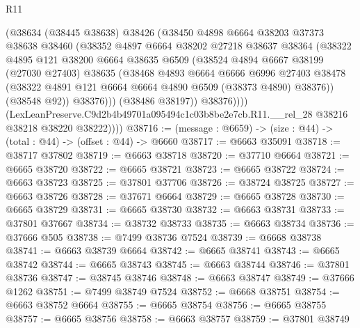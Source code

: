 \begin{lexlean}{R11}
\begin{coremodule}
                  (@38634
                    (@38445 @38638)
                    @38426
                    (@38450
                      @4898
                      @6664
                      @38203
                      @37373
                      @38638
                      @38460
                      (@38352
                        @4897
                        @6664
                        @38202
                        @27218
                        @38637
                        @38364
                        (@38322
                          @4895
                          @121
                          @38200
                          @6664
                          @38635
                          @6509
                          (@38524
                            @4894
                            @6667
                            @38199
                            (@27030 @27403)
                            @38635
                            (@38468
                              @4893
                              @6664
                              @6666
                              @6996
                              @27403
                              @38478
                              (@38322 @4891 @121 @6664 @6664 @4890 @6509 (@38373 @4890) @38376))
                            (@38548 @92))
                          @38376)))
                    (@38486 @38197))
                  @38376))))
          (LexLeanPreserve.C9d2b4b49701a095494c1c03b8be2e7cb.R11.__rel_28
            @38216
            @38218
            @38220
            @38222))))
@38716 := (message : @6659) -> (size : @44) -> (total : @44) -> (offset : @44) -> @6660
@38717 := @6663 @35091
@38718 := @38717 @37802
@38719 := @6663 @38718
@38720 := @37710 @6664
@38721 := @6665 @38720
@38722 := @6665 @38721
@38723 := @6665 @38722
@38724 := @6663 @38723
@38725 := @37801 @37706
@38726 := @38724 @38725
@38727 := @6663 @38726
@38728 := @37671 @6664
@38729 := @6665 @38728
@38730 := @6665 @38729
@38731 := @6665 @38730
@38732 := @6663 @38731
@38733 := @37801 @37667
@38734 := @38732 @38733
@38735 := @6663 @38734
@38736 := @37666 @505
@38738 := @7499 @38736 @7524
@38739 := @6668 @38738
@38741 := @6663 @38739 @6664
@38742 := @6665 @38741
@38743 := @6665 @38742
@38744 := @6665 @38743
@38745 := @6663 @38744
@38746 := @37801 @38736
@38747 := @38745 @38746
@38748 := @6663 @38747
@38749 := @37666 @1262
@38751 := @7499 @38749 @7524
@38752 := @6668 @38751
@38754 := @6663 @38752 @6664
@38755 := @6665 @38754
@38756 := @6665 @38755
@38757 := @6665 @38756
@38758 := @6663 @38757
@38759 := @37801 @38749

\end{coremodule}
\end{lexlean}
